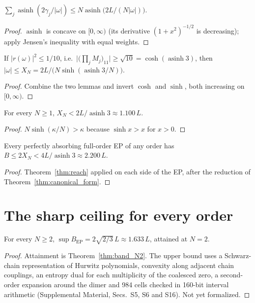 \begin{lemma}\label{lem:envelope_jensen}
\leanok
$\sum_j\operatorname{asinh}(2\gamma_j/|\omega|)\le N\operatorname{asinh}\big(2L/(N|\omega|)\big)$.
\end{lemma}
\begin{proof}\leanok
$\operatorname{asinh}$ is concave on $[0,\infty)$ (its derivative $(1+x^2)^{-1/2}$ is decreasing);
apply Jensen's inequality with equal weights.
\end{proof}

\begin{theorem}\label{thm:reach}
\leanok
{}
If $|r(\omega)|^2\le1/10$, i.e.\ $\big|\big(\prod_jM_j\big)_{11}\big|\ge\sqrt{10}=\cosh(\operatorname{asinh}3)$,
then $|\omega|\le X_N=2L/\big(N\sinh(\operatorname{asinh}3/N)\big)$.
\end{theorem}
\begin{proof}\leanok
Combine the two lemmas and invert $\cosh$ and $\sinh$, both increasing on $[0,\infty)$.
\end{proof}

\begin{lemma}\label{lem:reach_lt}
\leanok
For every $N\ge1$, $X_N<2L/\operatorname{asinh}3\approx1.100\,L$.
\end{lemma}
\begin{proof}\leanok
$N\sinh(\kappa/N)>\kappa$ because $\sinh x>x$ for $x>0$.
\end{proof}

\begin{corollary}\label{cor:edge_all}
Every perfectly absorbing full-order EP of any order has $B\le 2X_N<4L/\operatorname{asinh}3\approx2.200\,L$.
\end{corollary}
\begin{proof}
Theorem~\ref{thm:reach} applied on each side of the EP, after the reduction of
Theorem~\ref{thm:canonical_form}.
\end{proof}

\chapter{The sharp ceiling for every order}

\begin{theorem}\label{thm:sup_EP}
For every $N\ge2$, $\sup B_{\mathrm{EP}}=2\sqrt{2/3}\,L\approx1.633\,L$, attained at $N=2$.
\end{theorem}
\begin{proof}
Attainment is Theorem~\ref{thm:band_N2}. The upper bound uses a Schwarz-chain representation of
Hurwitz polynomials, convexity along adjacent chain couplings, an entropy dual for each multiplicity
of the coalesced zero, a second-order expansion around the dimer and 984 cells checked in 160-bit
interval arithmetic (Supplemental Material, Secs.~S5, S6 and S16). Not yet formalized.
\end{proof}
